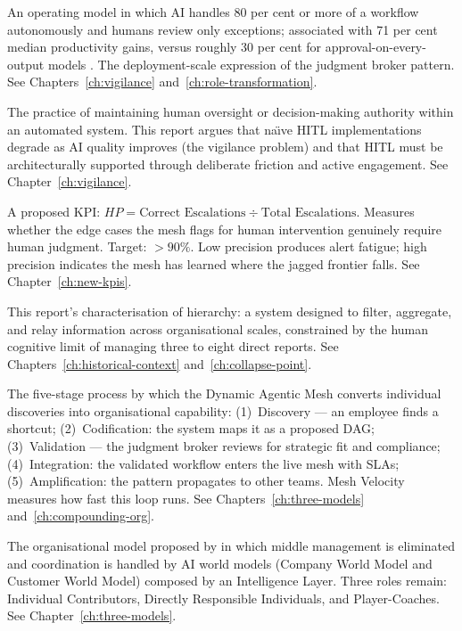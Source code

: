 \begin{description}[style=nextline, leftmargin=2em, font=\bfseries\color{navyblue}]
\item[Escalation Model]
An operating model in which AI handles 80 per cent or more of a workflow autonomously and humans review only exceptions; associated with 71 per cent median productivity gains, versus roughly 30 per cent for approval-on-every-output models \parencite{Pereira2026Playbook}. The deployment-scale expression of the judgment broker pattern. See Chapters~\ref{ch:vigilance} and~\ref{ch:role-transformation}.

\item[HITL (Human-in-the-Loop)]
The practice of maintaining human oversight or decision-making authority within an automated system. This report argues that na\"{\i}ve HITL implementations degrade as AI quality improves (the vigilance problem) and that HITL must be architecturally supported through deliberate friction and active engagement. See Chapter~\ref{ch:vigilance}.

\item[HITL Precision (HP)]
A proposed KPI: $HP = \text{Correct Escalations} \div \text{Total Escalations}$. Measures whether the edge cases the mesh flags for human intervention genuinely require human judgment. Target: $>90\%$. Low precision produces alert fatigue; high precision indicates the mesh has learned where the jagged frontier falls. See Chapter~\ref{ch:new-kpis}.

\item[Information Routing Protocol]
This report's characterisation of hierarchy: a system designed to filter, aggregate, and relay information across organisational scales, constrained by the human cognitive limit of managing three to eight direct reports. See Chapters~\ref{ch:historical-context} and~\ref{ch:collapse-point}.

\item[Insight Ingestion Loop]
The five-stage process by which the Dynamic Agentic Mesh converts individual discoveries into organisational capability: (1)~Discovery --- an employee finds a shortcut; (2)~Codification: the system maps it as a proposed DAG; (3)~Validation --- the judgment broker reviews for strategic fit and compliance; (4)~Integration: the validated workflow enters the live mesh with SLAs; (5)~Amplification: the pattern propagates to other teams. Mesh Velocity measures how fast this loop runs. See Chapters~\ref{ch:three-models} and~\ref{ch:compounding-org}.

\item[Intelligence Layer]
The organisational model proposed by \textcite{DorseyBotha2026} in which middle management is eliminated and coordination is handled by AI world models (Company World Model and Customer World Model) composed by an Intelligence Layer. Three roles remain: Individual Contributors, Directly Responsible Individuals, and Player-Coaches. See Chapter~\ref{ch:three-models}.


\end{description}
